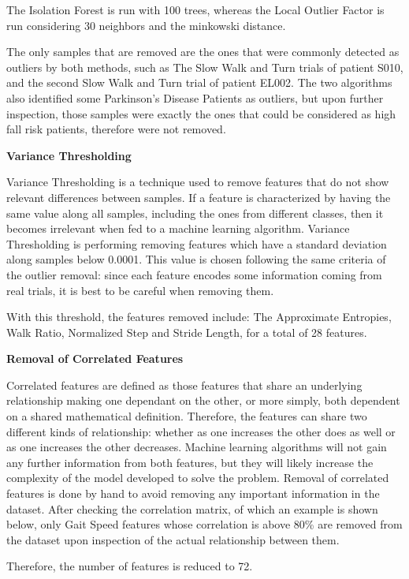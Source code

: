 The Isolation Forest is run with 100 trees, whereas the Local Outlier Factor is run considering 30 neighbors and the minkowski distance. 

The only samples that are removed are the ones that were commonly detected as outliers by both methods, such as  The Slow Walk and Turn trials of patient S010, and the second Slow Walk and Turn trial of patient EL002. The two algorithms also identified some Parkinson's Disease Patients as outliers, but upon further inspection, those samples were exactly the ones that could be considered as high fall risk patients, therefore were not removed. 

\textbf{Variance Thresholding}

Variance Thresholding is a technique used to remove features that do not show relevant differences between samples. If a feature is characterized by having the same value along all samples, including the ones from different classes, then it becomes irrelevant when fed to a machine learning algorithm. 
Variance Thresholding is performing removing features which have a standard deviation along samples below 0.0001. This value is chosen following the same criteria of the outlier removal: since each feature encodes some information coming from real trials, it is best to be careful when removing them.

With this threshold, the features removed include: The Approximate Entropies, Walk Ratio, Normalized Step and Stride Length, for a total of 28 features.

\textbf{Removal of Correlated Features}

Correlated features are defined as those features that share an underlying relationship making one dependant on the other, or more simply, both dependent on a shared mathematical definition. Therefore, the features can share two different kinds of relationship: whether as one increases the other does as well or as one increases the other decreases. Machine learning algorithms will not gain any further information from both features, but they will likely increase the complexity of the model developed to solve the problem.
Removal of correlated features is done by hand to avoid removing any important information in the dataset.
After checking the correlation matrix, of which an example is shown below, only Gait Speed features whose correlation is above 80\% are removed from the dataset upon inspection of the actual relationship between them. 


Therefore, the number of features is reduced to 72.

